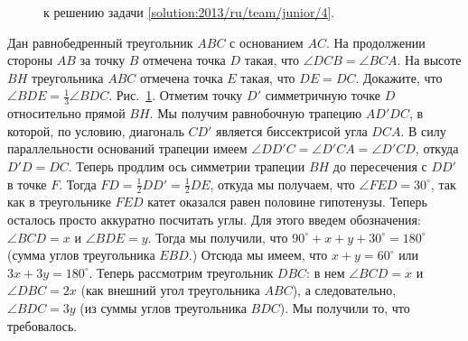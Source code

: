\ifsolution
\begin{figure}\centering
    \caption{к решению задачи \ref{solution:2013/ru/team/junior/4}.}
    \label{fig:solution:2013/ru/team/junior/4}
\end{figure}
\fi %

\problem{}
Дан равнобедренный треугольник $ABC$ с основанием $AC$.
На продолжении стороны $AB$ за точку $B$ отмечена точка $D$ такая, что
$\angle DCB = \angle BCA$.
На высоте $BH$ треугольника $ABC$ отмечена точка $E$ такая, что $DE = DC$.
Докажите, что $\angle BDE = \frac{1}{3} \angle BDC$. 
\solution
\label{solution:2013/ru/team/junior/4}
Рис.~\ref{fig:solution:2013/ru/team/junior/4}.
Отметим точку $D'$ симметричную точке $D$ относительно прямой $BH$.
Мы получим равнобочную трапецию $AD'DC$, в которой, по условию, диагональ $CD'$
является биссектрисой угла $DCA$.
В силу параллельности оснований трапеции имеем
$\angle D D' C = \angle D' C A = \angle D' C D$, откуда $D'D = DC$.
Теперь продлим ось симметрии трапеции $BH$ до пересечения с $DD'$ в точке $F$.
Тогда $FD = \frac{1}{2} DD' = \frac{1}{2} DE$, откуда мы получаем, что
$\angle FED = 30^\circ$, так как в треугольнике $FED$ катет оказался равен
половине гипотенузы.
Теперь осталось просто аккуратно посчитать углы.
Для этого введем обозначения: $\angle BCD = x$ и $\angle BDE = y$.
Тогда мы получили, что $90^\circ + x + y + 30^\circ = 180^\circ$
(сумма углов треугольника $EBD$.)
Отсюда мы имеем, что $x + y = 60^\circ$ или $3 x + 3 y = 180^\circ$.
Теперь рассмотрим треугольник $DBC$: в нем $\angle BCD = x$ и
$\angle DBC = 2 x$ (как внешний угол треугольника $ABC$), а следовательно,
$\angle BDC = 3 y$ (из суммы углов треугольника $BDC$).
Мы получили то, что требовалось.
\endproblem
